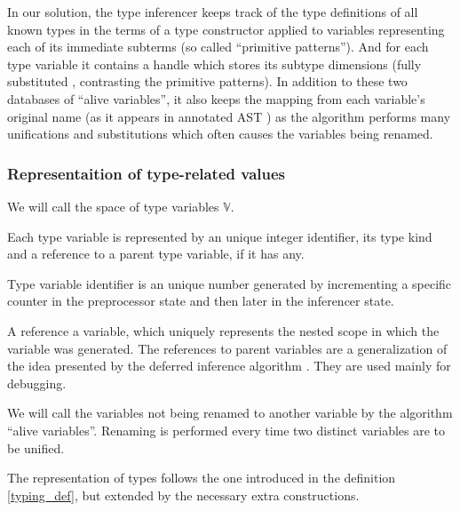 In our solution, the type inferencer keeps track of the type definitions of all known types in the terms of a type constructor applied to variables representing each of its immediate subterms (so called ``primitive patterns''). And for each type variable it contains a handle which stores its subtype dimensions (fully substituted , contrasting the primitive patterns). In addition to these two databases of ``alive variables'', it also keeps the mapping from each variable's original name (as it appears in annotated AST ) as the algorithm performs many unifications and substitutions which often causes the variables being renamed.

\subsubsection{Representaition of type-related values}

\begin{defn}
    We will call the space of type variables $\mathbb{V}$.

    Each type variable is represented by an unique integer identifier, its type kind and a reference to a parent type variable, if it has any.
\end{defn}

\begin{remark}
    Type variable identifier is an unique number generated by incrementing a specific counter in the preprocessor state  and then later in the inferencer state.
\end{remark}

\begin{remark}
    A reference a variable, which uniquely represents the nested scope in which the variable was generated. The references to parent variables are a generalization of the idea presented by the deferred inference algorithm  . They are used mainly for debugging.
\end{remark}

\begin{defn}
    We will call the variables not being renamed to another variable by the algorithm ``alive variables''. Renaming is performed every time two distinct variables are to be unified.
\end{defn}

The representation of types follows the one introduced in the definition \ref{typing_def}, but extended by the necessary extra constructions.

